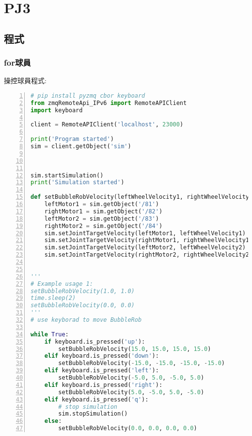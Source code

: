 \chapter{PJ3}

\section{程式}

\subsection{for球員}
\begin{flushleft}
\fontsize{14pt}{20pt}\sectionef\hspace{12pt}\quad 操控球員程式:
\end{flushleft}
\begin{lstlisting}[language=Python, frame=single, numbers=left, captionpos=b, basicstyle=\ttfamily\small, showstringspaces=false, breaklines=true, tabsize=4, xleftmargin=15pt]
# pip install pyzmq cbor keyboard
from zmqRemoteApi_IPv6 import RemoteAPIClient
import keyboard
 
client = RemoteAPIClient('localhost', 23000)
 
print('Program started')
sim = client.getObject('sim')
 
 
 
sim.startSimulation()
print('Simulation started')
 
def setBubbleRobVelocity(leftWheelVelocity1, rightWheelVelocity1, leftWheelVelocity2, rightWheelVelocity2):
    leftMotor1 = sim.getObject('/81')
    rightMotor1 = sim.getObject('/82')
    leftMotor2 = sim.getObject('/83')
    rightMotor2 = sim.getObject('/84')
    sim.setJointTargetVelocity(leftMotor1, leftWheelVelocity1)
    sim.setJointTargetVelocity(rightMotor1, rightWheelVelocity1)
    sim.setJointTargetVelocity(leftMotor2, leftWheelVelocity2)
    sim.setJointTargetVelocity(rightMotor2, rightWheelVelocity2)
    
 
'''
# Example usage 1:
setBubbleRobVelocity(1.0, 1.0)
time.sleep(2)
setBubbleRobVelocity(0.0, 0.0)
'''
# use keyborad to move BubbleRob
 
while True:
    if keyboard.is_pressed('up'):
        setBubbleRobVelocity(15.0, 15.0, 15.0, 15.0)
    elif keyboard.is_pressed('down'):
        setBubbleRobVelocity(-15.0, -15.0, -15.0, -15.0)
    elif keyboard.is_pressed('left'):
        setBubbleRobVelocity(-5.0, 5.0, -5.0, 5.0)
    elif keyboard.is_pressed('right'):
        setBubbleRobVelocity(5.0, -5.0, 5.0, -5.0)
    elif keyboard.is_pressed('q'):
        # stop simulation
        sim.stopSimulation()
    else:
        setBubbleRobVelocity(0.0, 0.0, 0.0, 0.0)
\end{lstlisting}

